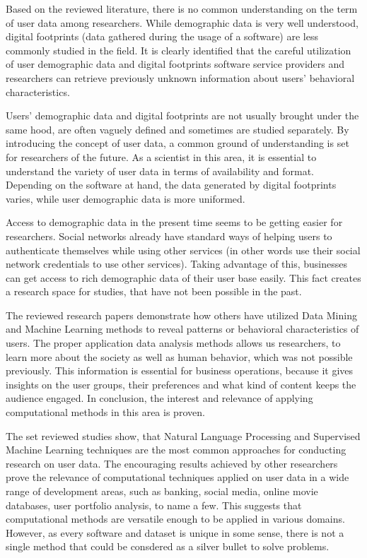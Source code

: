 Based on the reviewed literature, there is no common understanding on the term of user data among researchers. While demographic data is very well understood, digital footprints (data gathered during the usage of a software) are less commonly studied in the field. It is clearly identified that the careful utilization of user demographic data and digital footprints software service providers and researchers can retrieve previously unknown information about users' behavioral characteristics. 

Users' demographic data and digital footprints are not usually brought under the same hood, are often vaguely defined and sometimes are studied separately. By introducing the concept of user data, a common ground of understanding is set for researchers of the future. As a scientist in this area, it is essential to understand the variety of user data in terms of availability and format. Depending on the software at hand, the data generated by digital footprints varies, while user demographic data is more uniformed.

Access to demographic data in the present time seems to be getting easier for researchers. Social networks already have standard ways of helping users to authenticate themselves while using other services (in other words use their social network credentials to use other services). Taking advantage of this, businesses can get access to rich demographic data of their user base easily. This fact creates a research space for studies, that have not been possible in the past. 

The reviewed research papers demonstrate how others have utilized Data Mining and Machine Learning methods to reveal patterns or behavioral characteristics of users. The proper application data analysis methods allows us researchers, to learn more about the society as well as human behavior, which was not possible previously. This information is essential for business operations, because it gives insights on the user groups, their preferences and what kind of content keeps the audience engaged. In conclusion, the interest and relevance of applying computational methods in this area is proven.

The set reviewed studies show, that Natural Language Processing and Supervised Machine Learning techniques are the most common approaches for conducting research on user data. The encouraging results achieved by other researchers prove the relevance of computational techniques applied on user data in a wide range of development areas, such as banking, social media, online movie databases, user portfolio analysis, to name a few. This suggests that computational methods are versatile enough to be applied in various domains. However, as every software and dataset is unique in some sense, there is not a single method that could be consdered as a silver bullet to solve problems. 

